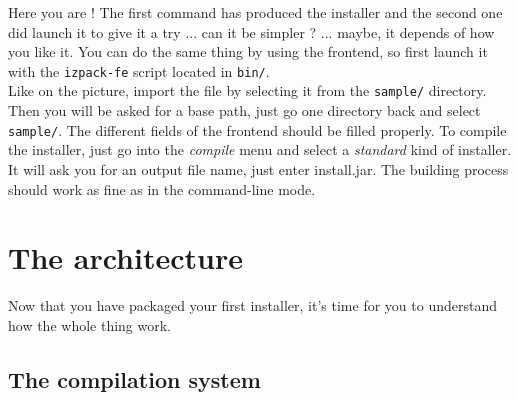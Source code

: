 Here you are ! The first command has produced the installer and the second one
did launch it to give it a try ... can it be simpler ?
... maybe, it depends of how you like it. You can do the same thing by using the
frontend, so first launch it with the \texttt{izpack-fe} script located in
\texttt{bin/}.\\

Like on the picture, import the file by selecting it from the \texttt{sample/}
directory. Then you will be asked for a base path, just go one directory back
and select \texttt{sample/}. The different fields of the frontend should be
filled properly. To compile the installer, just go into the \textit{compile}
menu and select a \textit{standard} kind of installer. It will ask you for an
output file name, just enter install.jar. The building process should work as
fine as in the command-line mode.\\

\section{The \IzPack architecture}

Now that you have packaged your first installer, it's time for you to understand
how the whole thing work.\\

\subsection{The compilation system}

